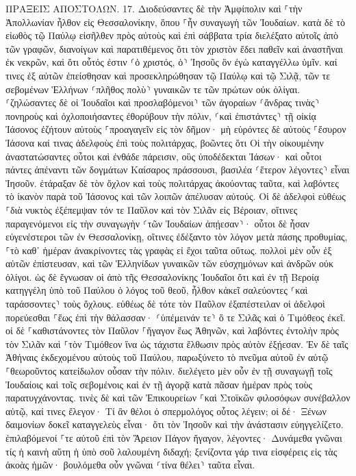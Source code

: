 \documentclass[twoside, 9pt]{extreport}
\begin{document}
ΠΡΑΞΕΙΣ ΑΠΟΣΤΟΛΩΝ.
17.
Διοδεύσαντες δὲ τὴν Ἀμφίπολιν καὶ ⸀τὴν Ἀπολλωνίαν ἦλθον εἰς Θεσσαλονίκην, ὅπου ⸀ἦν συναγωγὴ τῶν Ἰουδαίων. 
κατὰ δὲ τὸ εἰωθὸς τῷ Παύλῳ εἰσῆλθεν πρὸς αὐτοὺς καὶ ἐπὶ σάββατα τρία διελέξατο αὐτοῖς ἀπὸ τῶν γραφῶν, 
διανοίγων καὶ παρατιθέμενος ὅτι τὸν χριστὸν ἔδει παθεῖν καὶ ἀναστῆναι ἐκ νεκρῶν, καὶ ὅτι οὗτός ἐστιν ⸂ὁ χριστός, ὁ⸃ Ἰησοῦς ὃν ἐγὼ καταγγέλλω ὑμῖν. 
καί τινες ἐξ αὐτῶν ἐπείσθησαν καὶ προσεκληρώθησαν τῷ Παύλῳ καὶ τῷ Σιλᾷ, τῶν τε σεβομένων Ἑλλήνων ⸂πλῆθος πολὺ⸃ γυναικῶν τε τῶν πρώτων οὐκ ὀλίγαι. 
⸂ζηλώσαντες δὲ οἱ Ἰουδαῖοι καὶ προσλαβόμενοι⸃ τῶν ἀγοραίων ⸂ἄνδρας τινὰς⸃ πονηροὺς καὶ ὀχλοποιήσαντες ἐθορύβουν τὴν πόλιν, ⸂καὶ ἐπιστάντες⸃ τῇ οἰκίᾳ Ἰάσονος ἐζήτουν αὐτοὺς ⸀προαγαγεῖν εἰς τὸν δῆμον· 
μὴ εὑρόντες δὲ αὐτοὺς ⸀ἔσυρον Ἰάσονα καί τινας ἀδελφοὺς ἐπὶ τοὺς πολιτάρχας, βοῶντες ὅτι Οἱ τὴν οἰκουμένην ἀναστατώσαντες οὗτοι καὶ ἐνθάδε πάρεισιν, 
οὓς ὑποδέδεκται Ἰάσων· καὶ οὗτοι πάντες ἀπέναντι τῶν δογμάτων Καίσαρος πράσσουσι, βασιλέα ⸂ἕτερον λέγοντες⸃ εἶναι Ἰησοῦν. 
ἐτάραξαν δὲ τὸν ὄχλον καὶ τοὺς πολιτάρχας ἀκούοντας ταῦτα, 
καὶ λαβόντες τὸ ἱκανὸν παρὰ τοῦ Ἰάσονος καὶ τῶν λοιπῶν ἀπέλυσαν αὐτούς. 
Οἱ δὲ ἀδελφοὶ εὐθέως ⸀διὰ νυκτὸς ἐξέπεμψαν τόν τε Παῦλον καὶ τὸν Σιλᾶν εἰς Βέροιαν, οἵτινες παραγενόμενοι εἰς τὴν συναγωγὴν ⸂τῶν Ἰουδαίων ἀπῄεσαν⸃· 
οὗτοι δὲ ἦσαν εὐγενέστεροι τῶν ἐν Θεσσαλονίκῃ, οἵτινες ἐδέξαντο τὸν λόγον μετὰ πάσης προθυμίας, ⸀τὸ καθ᾽ ἡμέραν ἀνακρίνοντες τὰς γραφὰς εἰ ἔχοι ταῦτα οὕτως. 
πολλοὶ μὲν οὖν ἐξ αὐτῶν ἐπίστευσαν, καὶ τῶν Ἑλληνίδων γυναικῶν τῶν εὐσχημόνων καὶ ἀνδρῶν οὐκ ὀλίγοι. 
ὡς δὲ ἔγνωσαν οἱ ἀπὸ τῆς Θεσσαλονίκης Ἰουδαῖοι ὅτι καὶ ἐν τῇ Βεροίᾳ κατηγγέλη ὑπὸ τοῦ Παύλου ὁ λόγος τοῦ θεοῦ, ἦλθον κἀκεῖ σαλεύοντες ⸂καὶ ταράσσοντες⸃ τοὺς ὄχλους. 
εὐθέως δὲ τότε τὸν Παῦλον ἐξαπέστειλαν οἱ ἀδελφοὶ πορεύεσθαι ⸀ἕως ἐπὶ τὴν θάλασσαν· ⸂ὑπέμεινάν τε⸃ ὅ τε Σιλᾶς καὶ ὁ Τιμόθεος ἐκεῖ. 
οἱ δὲ ⸀καθιστάνοντες τὸν Παῦλον ⸀ἤγαγον ἕως Ἀθηνῶν, καὶ λαβόντες ἐντολὴν πρὸς τὸν Σιλᾶν καὶ ⸀τὸν Τιμόθεον ἵνα ὡς τάχιστα ἔλθωσιν πρὸς αὐτὸν ἐξῄεσαν. 
Ἐν δὲ ταῖς Ἀθήναις ἐκδεχομένου αὐτοὺς τοῦ Παύλου, παρωξύνετο τὸ πνεῦμα αὐτοῦ ἐν αὐτῷ ⸀θεωροῦντος κατείδωλον οὖσαν τὴν πόλιν. 
διελέγετο μὲν οὖν ἐν τῇ συναγωγῇ τοῖς Ἰουδαίοις καὶ τοῖς σεβομένοις καὶ ἐν τῇ ἀγορᾷ κατὰ πᾶσαν ἡμέραν πρὸς τοὺς παρατυγχάνοντας. 
τινὲς δὲ καὶ τῶν Ἐπικουρείων ⸀καὶ Στοϊκῶν φιλοσόφων συνέβαλλον αὐτῷ, καί τινες ἔλεγον· Τί ἂν θέλοι ὁ σπερμολόγος οὗτος λέγειν; οἱ δέ· Ξένων δαιμονίων δοκεῖ καταγγελεὺς εἶναι· ὅτι τὸν Ἰησοῦν καὶ τὴν ἀνάστασιν εὐηγγελίζετο. 
ἐπιλαβόμενοί ⸀τε αὐτοῦ ἐπὶ τὸν Ἄρειον Πάγον ἤγαγον, λέγοντες· Δυνάμεθα γνῶναι τίς ἡ καινὴ αὕτη ἡ ὑπὸ σοῦ λαλουμένη διδαχή; 
ξενίζοντα γάρ τινα εἰσφέρεις εἰς τὰς ἀκοὰς ἡμῶν· βουλόμεθα οὖν γνῶναι ⸂τίνα θέλει⸃ ταῦτα εἶναι. 
\end{document}
